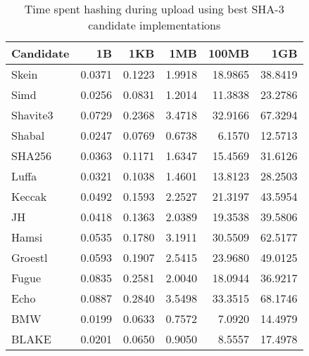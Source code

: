 \begin{table} 
  \centering 
  \caption{Time spent hashing during upload using best SHA-3 candidate implementations}
  \begin{tabular}{ | l | r | r | r | r | r | }
      \hline
      \textbf{Candidate} & \textbf{1B} & \textbf{1KB} & \textbf{1MB} & \textbf{100MB} & \textbf{1GB} \\ \hline
      Skein & 0.0371 & 0.1223 & 1.9918 & 18.9865 & 38.8419 \\ \hline
      Simd & 0.0256 & 0.0831 & 1.2014 & 11.3838 & 23.2786 \\ \hline
      Shavite3 & 0.0729 & 0.2368 & 3.4718 & 32.9166 & 67.3294 \\ \hline
      Shabal & 0.0247 & 0.0769 & 0.6738 & 6.1570 & 12.5713 \\ \hline
      SHA256 & 0.0363 & 0.1171 & 1.6347 & 15.4569 & 31.6126 \\ \hline
      Luffa & 0.0321 & 0.1038 & 1.4601 & 13.8123 & 28.2503 \\ \hline
      Keccak & 0.0492 & 0.1593 & 2.2527 & 21.3197 & 43.5954 \\ \hline
      JH & 0.0418 & 0.1363 & 2.0389 & 19.3538 & 39.5806 \\ \hline
      Hamsi & 0.0535 & 0.1780 & 3.1911 & 30.5509 & 62.5177 \\ \hline
      Groestl & 0.0593 & 0.1907 & 2.5415 & 23.9680 & 49.0125 \\ \hline
      Fugue & 0.0835 & 0.2581 & 2.0040 & 18.0944 & 36.9217 \\ \hline
      Echo & 0.0887 & 0.2840 & 3.5498 & 33.3515 & 68.1746 \\ \hline
      BMW & 0.0199 & 0.0633 & 0.7572 & 7.0920 & 14.4979 \\ \hline
      BLAKE & 0.0201 & 0.0650 & 0.9050 & 8.5557 & 17.4978 \\ \hline
  \end{tabular} 
  \label{tbl:tahoe:optimized_p}
\end{table}
